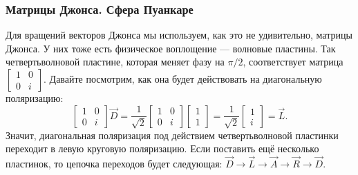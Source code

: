 \subsubsection{Матрицы Джонса. Сфера Пуанкаре}
Для вращений векторов Джонса мы используем, как это не удивительно, матрицы
Джонса. У них тоже есть физическое воплощение --- волновые пластины. Так
четвертьволновой пластине, которая меняет фазу на $\pi/2$, соответствует
матрица $\begin{bmatrix} 1 & 0 \\ 0 & i \end{bmatrix}$. Давайте посмотрим, как она будет действовать на диагональную поляризацию:
\[
  \begin{bmatrix} 1 & 0 \\ 0 & i \end{bmatrix}\Vec{D} = \frac{1}{\sqrt{2}}\begin{bmatrix} 1 & 0 \\ 0 & i \end{bmatrix}\begin{bmatrix} 1 \\ 1 \end{bmatrix} = \frac{1}{\sqrt{2}}\begin{bmatrix} 1 \\ i \end{bmatrix} = \Vec{L}.
\]
Значит, диагональная поляризация под действием четвертьволновой пластинки
переходит в левую круговую поляризацию. Если поставить ещё несколько пластинок,
то цепочка переходов будет следующая: $\Vec{D} \rightarrow \Vec{L} \rightarrow
  \Vec{A} \rightarrow \Vec{R}\rightarrow \Vec{D}$.

